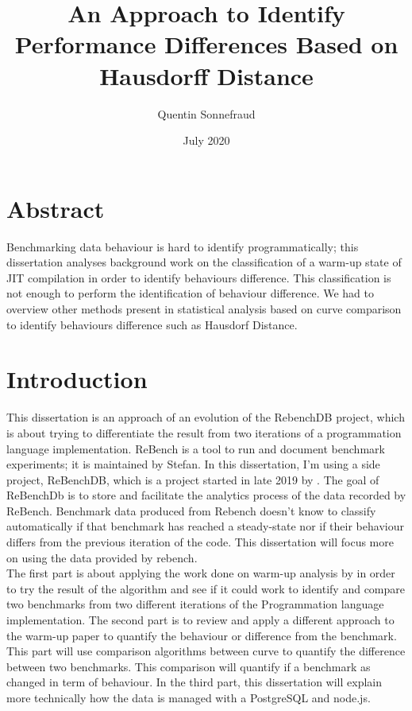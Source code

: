 \documentclass{article}
\title{An Approach to Identify Performance Differences Based on Hausdorff Distance}
\author{Quentin Sonnefraud}
\date{July 2020}
\begin{document}
\maketitle

\tableofcontents

\section{Abstract}

Benchmarking data behaviour is hard to identify programmatically; this dissertation analyses background work on the classification of a warm-up state of JIT compilation in order to identify behaviours difference. This classification is not enough to perform the identification of behaviour difference. We had to overview other methods present in statistical analysis based on curve comparison to identify behaviours difference such as Hausdorf Distance.

\section{Introduction}

This dissertation is an approach of an evolution of the RebenchDB project, which is about trying to differentiate the result from two iterations of a programmation language implementation. 
ReBench is a tool to run and document benchmark experiments; it is maintained by Stefan\citeauthor{ReBench:2018}. In this dissertation, I'm using a side project, ReBenchDB, which is a project started in late 2019 by \citeauthor{ReBench:2018}. The goal of ReBenchDb is to store and facilitate the analytics process of the data recorded by ReBench. Benchmark data produced from Rebench doesn't know to classify automatically if that benchmark has reached a steady-state nor if their behaviour differs from the previous iteration of the code. This dissertation will focus more on using the data provided by rebench. \\ 
The first part is about applying the work done on warm-up analysis by \citep{barrett2017virtual} in order to try the result of the algorithm and see if it could work to identify and compare two benchmarks from two different iterations of the Programmation language implementation.
The second part is to review and apply a different approach to the warm-up paper to quantify the behaviour or difference from the benchmark. This part will use comparison algorithms between curve to quantify the difference between two benchmarks. This comparison will quantify if a benchmark as changed in term of behaviour. In the third part, this dissertation will explain more technically how the data is managed with a PostgreSQL and node.js.\\
\end{document}
